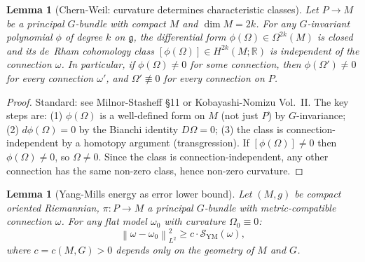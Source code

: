 \documentclass[12pt]{amsart}
\theoremstyle{plain}
\newtheorem{lemma}[theorem]{Lemma}
\theoremstyle{definition}
\newcommand{\fg}{\mathfrak{g}}
\newcommand{\R}{\mathbb{R}}
\newcommand{\norm}[1]{\left\lVert #1 \right\rVert}
\begin{document}
\begin{lemma}[Chern-Weil: curvature determines characteristic classes]
\label{lem:chern-weil}
Let $P \to M$ be a principal $G$-bundle with compact $M$ and $\dim M = 2k$.
For any $G$-invariant polynomial $\phi$ of degree $k$ on $\fg$, the
differential form $\phi(\Omega) \in \Omega^{2k}(M)$ is closed and its
de~Rham cohomology class $[\phi(\Omega)] \in H^{2k}(M;\R)$ is independent
of the connection $\omega$. In particular, if $\phi(\Omega) \neq 0$ for some
connection, then $\phi(\Omega') \neq 0$ for \emph{every} connection
$\omega'$, and $\Omega' \not\equiv 0$ for every connection on $P$.
\end{lemma}

\begin{proof}
Standard: see Milnor-Stasheff \S11 or Kobayashi-Nomizu Vol.~II. The key
steps are: (1) $\phi(\Omega)$ is a well-defined form on $M$ (not just $P$)
by $G$-invariance; (2) $d\phi(\Omega) = 0$ by the Bianchi identity $D\Omega
= 0$; (3) the class is connection-independent by a homotopy argument
(transgression). If $[\phi(\Omega)] \neq 0$ then $\phi(\Omega) \neq 0$, so
$\Omega \neq 0$. Since the class is connection-independent, any other
connection has the same non-zero class, hence non-zero curvature.
\end{proof}

\begin{lemma}[Yang-Mills energy as error lower bound]
\label{lem:ym-bound}
Let $(M,g)$ be compact oriented Riemannian, $\pi:P\to M$ a principal
$G$-bundle with metric-compatible connection $\omega$. For any flat model
$\omega_0$ with curvature $\Omega_0 \equiv 0$:
\[
  \norm{\omega - \omega_0}_{L^2}^2 \geq c \cdot \mathcal{S}_{\mathrm{YM}}(\omega),
\]
where $c = c(M,G) > 0$ depends only on the geometry of $M$ and $G$.
\end{lemma}
\end{document}
